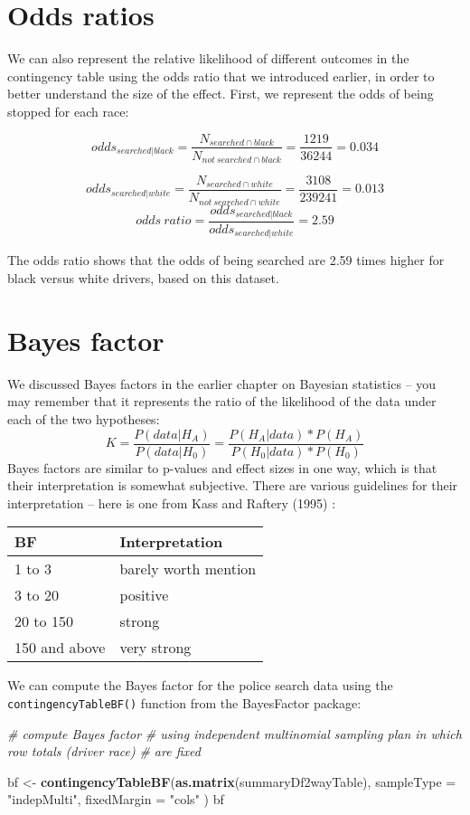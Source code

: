 \documentclass[]{book}
\newenvironment{Shaded}{\begin{snugshade}}{\end{snugshade}}
\newcommand{\KeywordTok}[1]{\textcolor[rgb]{0.13,0.29,0.53}{\textbf{#1}}}
\newcommand{\DataTypeTok}[1]{\textcolor[rgb]{0.13,0.29,0.53}{#1}}
\newcommand{\StringTok}[1]{\textcolor[rgb]{0.31,0.60,0.02}{#1}}
\newcommand{\CommentTok}[1]{\textcolor[rgb]{0.56,0.35,0.01}{\textit{#1}}}
\newcommand{\NormalTok}[1]{#1}
\theoremstyle{definition}
\theoremstyle{definition}
\theoremstyle{definition}
\theoremstyle{remark}
\begin{document}
\section{Odds ratios}\label{odds-ratios}

We can also represent the relative likelihood of different outcomes in
the contingency table using the odds ratio that we introduced earlier,
in order to better understand the size of the effect. First, we
represent the odds of being stopped for each race:

\[
odds_{searched|black} = \frac{N_{searched\cap black}}{N_{not\ searched\cap black}} = \frac{1219}{36244} = 0.034
\]

\[
odds_{searched|white} = \frac{N_{searched\cap white}}{N_{not\ searched\cap white}} = \frac{3108}{239241} = 0.013
\] \[
odds\ ratio = \frac{odds_{searched|black}}{odds_{searched|white}} = 2.59
\]

The odds ratio shows that the odds of being searched are 2.59 times
higher for black versus white drivers, based on this dataset.

\section{Bayes factor}\label{bayes-factor}

We discussed Bayes factors in the earlier chapter on Bayesian statistics
-- you may remember that it represents the ratio of the likelihood of
the data under each of the two hypotheses: \[ 
K = \frac{P(data|H_A)}{P(data|H_0)} = \frac{P(H_A|data)*P(H_A)}{P(H_0|data)*P(H_0)}
\] Bayes factors are similar to p-values and effect sizes in one way,
which is that their interpretation is somewhat subjective. There are
various guidelines for their interpretation -- here is one from Kass and
Raftery (1995) :

\begin{longtable}[]{@{}ll@{}}
\toprule
BF & Interpretation\tabularnewline
\midrule
\endhead
1 to 3 & barely worth mention\tabularnewline
3 to 20 & positive\tabularnewline
20 to 150 & strong\tabularnewline
150 and above & very strong\tabularnewline
\bottomrule
\end{longtable}

We can compute the Bayes factor for the police search data using the
\texttt{contingencyTableBF()} function from the BayesFactor package:

\begin{Shaded}
\begin{Highlighting}[]
\CommentTok{# compute Bayes factor }
\CommentTok{# using independent multinomial sampling plan in which row totals (driver race)}
\CommentTok{# are fixed}

\NormalTok{bf <-}\StringTok{ }
\StringTok{  }\KeywordTok{contingencyTableBF}\NormalTok{(}\KeywordTok{as.matrix}\NormalTok{(summaryDf2wayTable),}
  \DataTypeTok{sampleType =} \StringTok{"indepMulti"}\NormalTok{,}
  \DataTypeTok{fixedMargin =} \StringTok{"cols"}
\NormalTok{)}
\NormalTok{bf}
\end{Highlighting}
\end{Shaded}
\end{document}

